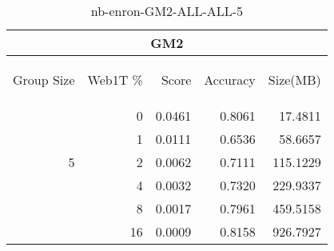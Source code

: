 \begin{center}
\begin{table}[htbp] 
 \begin{center}
\begin{tabular}{ | r | r | r | r | r |}
\hline
\multicolumn{5}{|c|}{GM2}\\
\hline
\begin{sideways}Group Size\end{sideways} & \begin{sideways}Web1T \%\end{sideways} & \begin{sideways}Score\end{sideways} & \begin{sideways}Accuracy\end{sideways} & \begin{sideways}Size(MB)\end{sideways}\\
\hline
\multirow{5}{*}{5}
 & 0 & 0.0461 & 0.8061 & 17.4811\\ \cline{2-5}
 & 1 & 0.0111 & 0.6536 & 58.6657\\ \cline{2-5}
 & 2 & 0.0062 & 0.7111 & 115.1229\\ \cline{2-5}
 & 4 & 0.0032 & 0.7320 & 229.9337\\ \cline{2-5}
 & 8 & 0.0017 & 0.7961 & 459.5158\\ \cline{2-5}
 & 16 & 0.0009 & 0.8158 & 926.7927\\ \cline{2-5}
\hline
\end{tabular}
\caption{nb-enron-GM2-ALL-ALL-5}
\label{table:nb-enron-GM2-ALL-ALL-5}
\end{center}
 \end{table}
\end{center}


